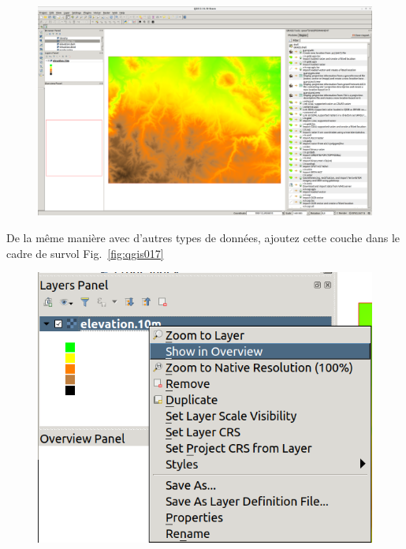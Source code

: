 \begin{figure}[htbp]
   \centering
   \includegraphics[scale=0.083]{qgis016.png}
   \caption{}
   \label{fig:qgis016}
\end{figure}

De la m\^eme mani\`ere avec d'autres types de donn\'ees, ajoutez cette couche dans le cadre de survol Fig.~\ref{fig:qgis017}

\begin{figure}[htbp]
   \centering
   \includegraphics[scale=0.35]{qgis017.png}
   \caption{}
   \label{fig:qgis0017}
\end{figure}

